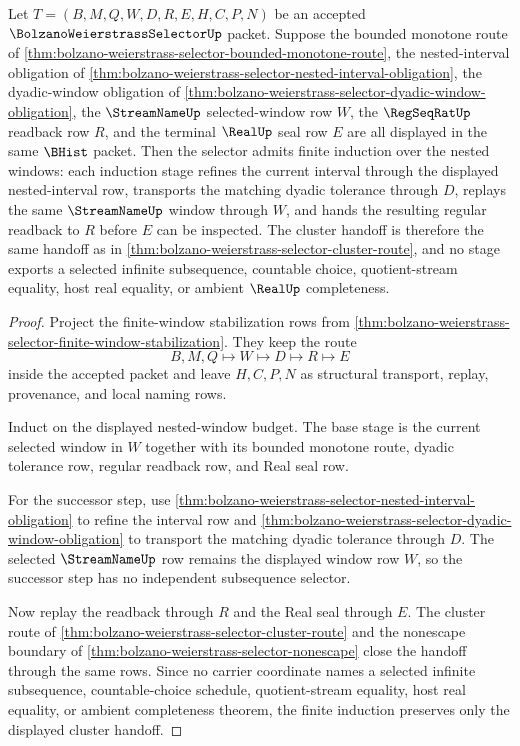 \begin{theorem}
\label{thm:bolzano-weierstrass-selector-finite-nested-window-induction}
Let $T=(B,M,Q,W,D,R,E,H,C,P,N)$ be an accepted
$\BolzanoWeierstrassSelectorUp$ packet. Suppose the bounded monotone route of
\autoref{thm:bolzano-weierstrass-selector-bounded-monotone-route}, the
nested-interval obligation of
\autoref{thm:bolzano-weierstrass-selector-nested-interval-obligation}, the
dyadic-window obligation of
\autoref{thm:bolzano-weierstrass-selector-dyadic-window-obligation}, the
$\StreamNameUp$ selected-window row $W$, the $\RegSeqRatUp$ readback row $R$,
and the terminal $\RealUp$ seal row $E$ are all displayed in the same $\BHist$
packet. Then the selector admits finite induction over the nested windows:
each induction stage refines the current interval through the displayed
nested-interval row, transports the matching dyadic tolerance through $D$,
replays the same $\StreamNameUp$ window through $W$, and hands the resulting
regular readback to $R$ before $E$ can be inspected. The cluster handoff is
therefore the same handoff as in
\autoref{thm:bolzano-weierstrass-selector-cluster-route}, and no stage exports
a selected infinite subsequence, countable choice, quotient-stream equality,
host real equality, or ambient $\RealUp$ completeness.
\end{theorem}
\begin{proof}
Project the finite-window stabilization rows from
\autoref{thm:bolzano-weierstrass-selector-finite-window-stabilization}. They
keep the route
$$
B,M,Q\longmapsto W\longmapsto D\longmapsto R\longmapsto E
$$
inside the accepted packet and leave $H,C,P,N$ as structural transport,
replay, provenance, and local naming rows.

Induct on the displayed nested-window budget. The base stage is the current
selected window in $W$ together with its bounded monotone route, dyadic
tolerance row, regular readback row, and Real seal row.

For the successor step, use
\autoref{thm:bolzano-weierstrass-selector-nested-interval-obligation} to refine
the interval row and
\autoref{thm:bolzano-weierstrass-selector-dyadic-window-obligation} to transport
the matching dyadic tolerance through $D$. The selected $\StreamNameUp$ row
remains the displayed window row $W$, so the successor step has no independent
subsequence selector.

Now replay the readback through $R$ and the Real seal through $E$. The cluster
route of \autoref{thm:bolzano-weierstrass-selector-cluster-route} and the
nonescape boundary of
\autoref{thm:bolzano-weierstrass-selector-nonescape} close the handoff through
the same rows. Since no carrier coordinate names a selected infinite
subsequence, countable-choice schedule, quotient-stream equality, host real
equality, or ambient completeness theorem, the finite induction preserves only
the displayed cluster handoff.
\end{proof}

